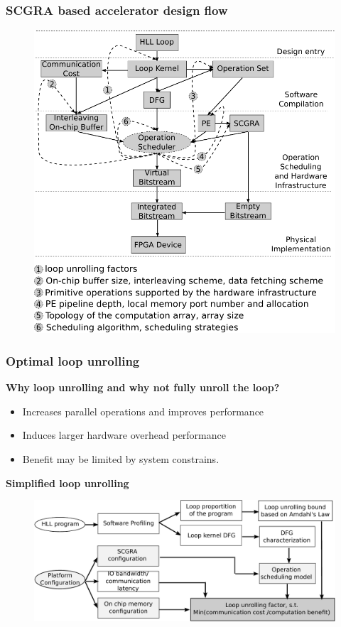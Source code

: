 \documentclass{beamer}
\begin{document}
\begin{frame}[t]
\frametitle{SCGRA based accelerator design flow}

\begin{figure}
\vspace{-1em}
\includegraphics[width=0.76\linewidth]{design-space-overview2}
\end{figure}

\end{frame}

\begin{frame}[t]
\frametitle{Optimal loop unrolling}

\textbf{Why loop unrolling and why not fully unroll the loop?}
\begin{itemize}
\item Increases parallel operations and improves performance
\item Induces larger hardware overhead performance 
\item Benefit may be limited by system constrains.
\end{itemize}

\textbf{Simplified loop unrolling}
\begin{figure}
\vspace{-1em}
\includegraphics[width=0.95\linewidth]{system-loop-unrolling}
\end{figure}

\end{frame}
\end{document}
